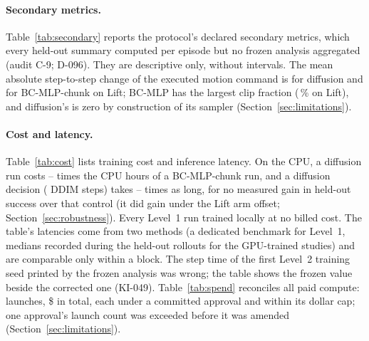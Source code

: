 \paragraph{Secondary metrics.} Table~\ref{tab:secondary} reports the protocol's declared
secondary metrics, which every held-out summary computed per episode but no frozen analysis
aggregated (audit C-9; D-096). They are descriptive only, without intervals. The mean absolute
step-to-step change of the executed motion command is  for diffusion
and  for BC-MLP-chunk on Lift; BC-MLP has the largest clip fraction
(\,\% on Lift), and diffusion's is zero by construction of its sampler
(Section~\ref{sec:limitations}).

\begin{table}[t]
\centering\small
\caption{Declared secondary metrics on the held-out starts, aggregated after the frozen
analysis (D-096; plain means, no intervals). Gripper sign changes per episode, with the range
of the per-seed means; mean absolute step-to-step change of the executed motion command; and
the clip fraction, the frozen mean over the six motion dimensions of the share of actions
clipped to the controller limits. All depend on episode length, which ends at first success.}
\label{tab:secondary}
\resizebox{\linewidth}{!}{}
\end{table}

\paragraph{Cost and latency.} Table~\ref{tab:cost} lists training cost and inference latency.
On the CPU, a diffusion run costs -- times the CPU
hours of a BC-MLP-chunk run, and a diffusion decision ( DDIM steps) takes
-- times as long, for no measured gain in held-out
success over that control (it did gain under the Lift arm offset;
Section~\ref{sec:robustness}). Every Level~1 run trained locally at no billed cost. The table's latencies come
from two methods (a dedicated benchmark for Level~1, medians recorded during the held-out
rollouts for the GPU-trained studies) and are comparable only within a block. The step time of the first
Level~2 training seed printed by the frozen analysis was wrong; the table shows the frozen value
beside the corrected one (KI-049). Table~\ref{tab:spend} reconciles all paid compute: 
launches, \$ in total, each under a committed approval and within its dollar
cap; one approval's launch count was exceeded before it was amended
(Section~\ref{sec:limitations}).

